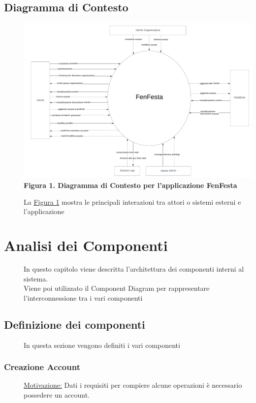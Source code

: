 \documentclass{article}
\begin{document}
\subsection{Diagramma di Contesto}
\begin{description}
    \item[] \includegraphics[scale=0.5]{Context.png} \\
        \textbf{Figura 1. Diagramma di Contesto per l'applicazione FenFesta} \label{fig:1}
    \item[] La \hyperref[fig:1]{Figura 1} mostra le principali interazioni tra attori o sistemi esterni e l'applicazione
\end{description}
\clearpage
\section{Analisi dei Componenti}
\begin{description}
    \item[] In questo capitolo viene descritta l'architettura dei componenti interni al sistema. \\
        Viene poi utilizzato il Component Diagram per rappresentare l'interconnessione tra i vari componenti
\end{description}
\subsection{Definizione dei componenti}
\begin{description}
    \item[] In questa sezione vengono definiti i vari componenti
\end{description}
\subsubsection{Creazione Account}
\begin{description}
    \item[] \underline{Motivazione:}
        Dati i requisiti per compiere alcune operazioni è necessario possedere un account.
\end{description}
\end{document}
